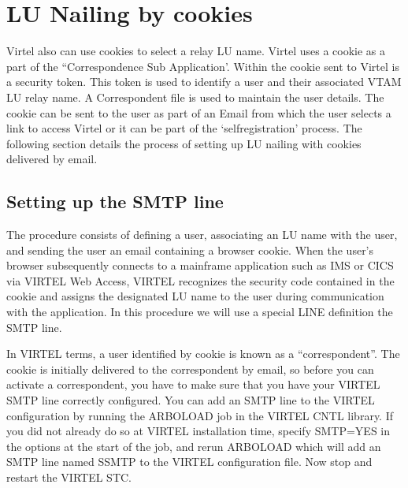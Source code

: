 \documentclass[letterpaper,10pt,english]{sphinxmanual}
\begin{document}
\newpage

\ignorespaces 

\section{LU Nailing by cookies}
\label{\detokenize{connectivity_guide:lu-nailing-by-cookies}}\label{\detokenize{connectivity_guide:index-153}}
\sphinxAtStartPar
Virtel also can use cookies to select a relay LU name. Virtel uses a cookie as a part of the “Correspondence Sub Application’. Within the cookie sent to Virtel is a security token. This token is used to identify a user and their associated VTAM LU relay name. A Correspondent file is used to maintain the user details. The cookie can be sent to the user as part of an Email from which the user selects a link to access Virtel or it can be part of the ‘self\sphinxhyphen{}registration’ process. The following section details the process of setting up LU nailing with cookies delivered by email.


\subsection{Setting up the SMTP line}
\label{\detokenize{connectivity_guide:setting-up-the-smtp-line}}
\sphinxAtStartPar
The procedure consists of defining a user, associating an LU name with the user, and sending the user an e\sphinxhyphen{}mail containing a browser cookie.  When the user’s browser subsequently connects to a mainframe application such as IMS or CICS via VIRTEL Web Access, VIRTEL recognizes the security code contained in the cookie and assigns the designated LU name to the user during communication with the application. In this procedure we will use a special LINE definition \sphinxhyphen{} the SMTP line.

\sphinxAtStartPar
In VIRTEL terms, a user identified by cookie is known as a “correspondent”.  The cookie is initially delivered to the correspondent by e\sphinxhyphen{}mail, so before you can activate a correspondent, you have to make sure that you have your VIRTEL SMTP line correctly configured. You can add an SMTP line to the VIRTEL configuration by running the ARBOLOAD job in the VIRTEL CNTL library. If you did not already do so at VIRTEL installation time, specify SMTP=YES in the options at the start of the job, and rerun ARBOLOAD which will add an SMTP line named S\sphinxhyphen{}SMTP to the VIRTEL configuration file.  Now stop and restart the VIRTEL STC.
\end{document}
